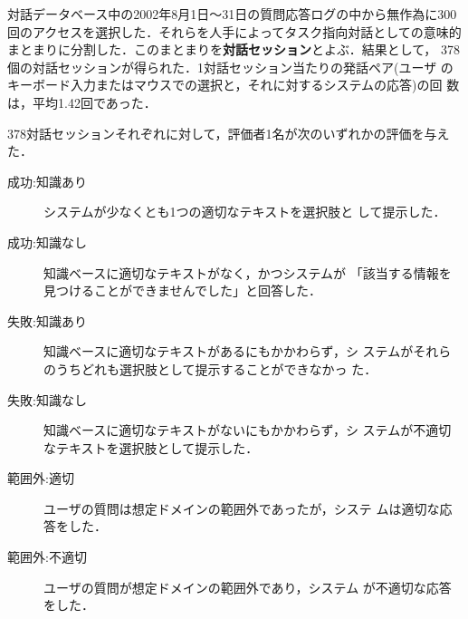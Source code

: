対話データベース中の2002年8月1日〜31日の質問応答ログの中から無作為に300 
回のアクセスを選択した．それらを人手によってタスク指向対話としての意味的
まとまりに分割した．このまとまりを{\bf 対話セッション}とよぶ．結果として，
378個の対話セッションが得られた．1対話セッション当たりの発話ペア(ユーザ
のキーボード入力またはマウスでの選択と，それに対するシステムの応答)の回
数は，平均1.42回であった．


378対話セッションそれぞれに対して，評価者1名が次のいずれかの評価を与えた．
\begin{description}
 \item[成功:知識あり] システムが少なくとも1つの適切なテキストを選択肢と
	    して提示した．
 \item[成功:知識なし] 知識ベースに適切なテキストがなく，かつシステムが
	    「該当する情報を見つけることができませんでした」と回答した．
 \item[失敗:知識あり] 知識ベースに適切なテキストがあるにもかかわらず，シ
	    ステムがそれらのうちどれも選択肢として提示することができなかっ
	    た．
 \item[失敗:知識なし] 知識ベースに適切なテキストがないにもかかわらず，シ
	    ステムが不適切なテキストを選択肢として提示した．
 \item[範囲外:適切] ユーザの質問は想定ドメインの範囲外であったが，システ
	    ムは適切な応答をした．
 \item[範囲外:不適切] ユーザの質問が想定ドメインの範囲外であり，システム
	    が不適切な応答をした．
\end{description}


